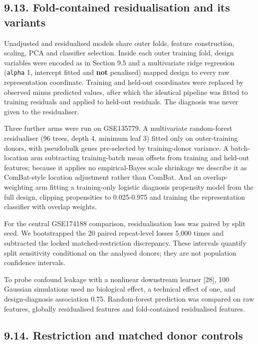 \subsection{9.13. Fold-contained residualisation and its variants}\label{fold-contained-residualisation-and-its-variants}

Unadjusted and residualised models share outer folds, feature construction, scaling, PCA and classifier selection. Inside each outer training fold, design variables were encoded as in Section 9.5 and a multivariate ridge regression (\texttt{alpha} 1, intercept fitted and \textbf{not} penalised) mapped design to every raw representation coordinate. Training and held-out coordinates were replaced by observed minus predicted values, after which the identical pipeline was fitted to training residuals and applied to held-out residuals. The diagnosis was never given to the residualiser.

Three further arms were run on GSE135779. A multivariate random-forest residualiser (96 trees, depth 4, minimum leaf 3) fitted only on outer-training donors, with pseudobulk genes pre-selected by training-donor variance. A batch-location arm subtracting training-batch mean offsets from training and held-out features; because it applies no empirical-Bayes scale shrinkage we describe it as ComBat-style location adjustment rather than ComBat. And an overlap-weighting arm fitting a training-only logistic diagnosis propensity model from the full design, clipping propensities to 0.025-0.975 and training the representation classifier with overlap weights.

For the central GSE174188 comparison, residualisation loss was paired by split seed. We bootstrapped the 20 paired repeat-level losses 5,000 times and subtracted the locked matched-restriction discrepancy. These intervals quantify split sensitivity conditional on the analysed donors; they are not population confidence intervals.

To probe confound leakage with a nonlinear downstream learner {[}28{]}, 100 Gaussian simulations used no biological effect, a technical effect of one, and design-diagnosis association 0.75. Random-forest prediction was compared on raw features, globally residualised features and fold-contained residualised features.

\subsection{9.14. Restriction and matched donor controls}\label{restriction-and-matched-donor-controls}

